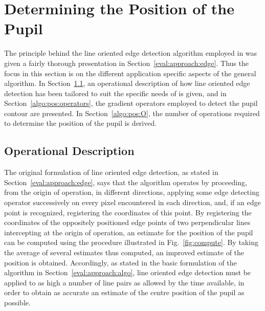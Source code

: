 
\section{Determining the Position of the Pupil}
\label{algo:pos}

The principle behind the line oriented edge detection algorithm
employed in {\octopus} was given a fairly thorough presentation in
Section~\ref{eval:approach:edge}.  Thus the focus in this section is
on the different application specific aspects of the general
algorithm.  In Section~\ref{algo:pos:operation}, an operational
description of how line oriented edge detection has been tailored to
suit the specific needs of {\octopus} is given, and in
Section~\ref{algo:pos:operators}, the gradient operators employed to
detect the pupil contour are presented.  In Section~\ref{algo:pos:O},
the number of operations required to determine the position of the
pupil is derived.

\subsection{Operational Description}
\label{algo:pos:operation}

The original formulation of line oriented edge detection, as stated in
Section~\ref{eval:approach:edge}, says that the algorithm operates by
proceeding, from the origin of operation, in different directions,
applying some edge detecting operator successively on every pixel
encountered in each direction, and, if an edge point is recognized,
registering the coordinates of this point.  By registering the
coordinates of the oppositely positioned edge points of two
perpendicular lines intercepting at the origin of operation, an
estimate for the position of the pupil can be computed using the
procedure illustrated in Fig.~\ref{fig:compute}.  By taking the
average of several estimates thus computed, an improved estimate of
the position is obtained.  Accordingly, as stated in the basic
formulation of the {\octopus} algorithm in
Section~\ref{eval:approach:algo}, line oriented edge detection must be
applied to as high a number of line pairs as allowed by the time
available, in order to obtain as accurate an estimate of the centre
position of the pupil as possible.

